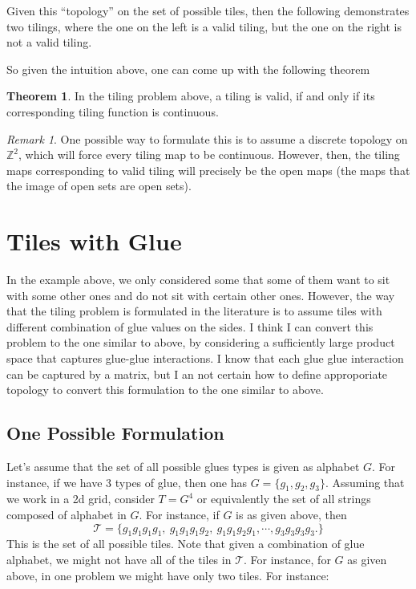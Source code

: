 \documentclass[11pt,a4paper]{article}
\newcommand{\Z}{\mathbb{Z}}
\theoremstyle{definition}
\theoremstyle{remark}
\newtheorem{remark}{Remark}
\theoremstyle{definition}
\newtheorem{theorem}{Theorem}
\begin{document}
	
	
	Given this ``topology'' on the set of possible tiles, then the following demonstrates two tilings, where the one on the left is a valid tiling, but the one on the right is not a valid tiling.
	
	
	
	\FloatBarrier
	
	So given the intuition above, one can come up with the following theorem
	
	\begin{theorem}
		In the tiling problem above, a tiling is valid, if and only if its corresponding tiling function is continuous.
	\end{theorem}
	
	
	
	\begin{remark}
		One possible way to formulate this is to assume a discrete topology on $ \Z^2 $, which will force every tiling map to be continuous. However, then, the tiling maps corresponding to valid tiling will precisely be the open maps (the maps that the image of open sets are open sets). 
	\end{remark}
	
	
	\section{Tiles with Glue}
	
	In the example above, we only considered some that some of them want to sit with some other ones and do not sit with certain other ones. However, the way that the tiling problem is formulated in the literature is to assume tiles with different combination of glue values on the sides. I think I can convert this problem to the one similar to above, by considering a sufficiently large product space that captures glue-glue interactions. I know that each glue glue interaction can be captured by a matrix, but I an not certain how to define approporiate topology to convert this formulation to the one similar to above.
	
	
	\subsection{One Possible Formulation}
	Let's assume that the set of all possible glues types is given as alphabet $ G $. For instance, if we have 3 types of glue, then one has $ G = \{g_1,g_2,g_3\} $. Assuming that we work in a 2d grid, consider $ T = G^4 $ or equivalently the set of all strings composed of alphabet in $ G $. For instance, if $ G $ is as given above, then
	\[ \mathcal{T} = \{ g_1g_1g_1g_1,\ g_1g_1g_1g_2,\ g_1g_1g_2g_1,\cdots, g_3g_3g_3g_3. \} \]
	This is the set of all possible tiles. Note that given a combination of glue alphabet, we might not have all of the tiles in $ \mathcal{T} $. For instance, for $ G $ as given above, in one problem we might have only two tiles. For instance:
	
	
\end{document}
